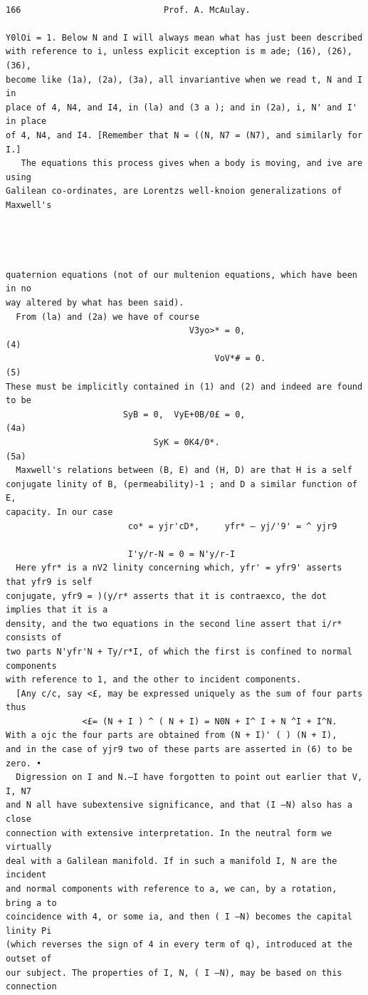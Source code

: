 \documentclass[10pt]{article}
\begin{document}
\clearpage
\begin{verbatim}

166                            Prof. A. McAulay.

Y0lOi = 1. Below N and I will always mean what has just been described
with reference to i, unless explicit exception is m ade; (16), (26), (36),
become like (1a), (2a), (3a), all invariantive when we read t, N and I in
place of 4, N4, and I4, in (la) and (3 a ); and in (2a), i, N' and I' in place
of 4, N4, and I4. [Remember that N = ((N, N7 = (N7), and similarly for I.]
   The equations this process gives when a body is moving, and ive are using
Galilean co-ordinates, are Lorentzs well-knoion generalizations of Maxwell's




quaternion equations (not of our multenion equations, which have been in no
way altered by what has been said).
  From (la) and (2a) we have of course
                                    V3yo>* = 0,                                  (4)
                                         VoV*# = 0.                               (5)
These must be implicitly contained in (1) and (2) and indeed are found to be
                       SyB = 0,  VyE+0B/0£ = 0,                                 (4a)
                             SyK = 0K4/0*.                                      (5a)
  Maxwell's relations between (B, E) and (H, D) are that H is a self­
conjugate linity of B, (permeability)-1 ; and D a similar function of E,
capacity. In our case
                        co* = yjr'cD*,     yfr* — yj/'9' = ^ yjr9

                        I'y/r-N = 0 = N'y/r-I
  Here yfr* is a nV2 linity concerning which, yfr' = yfr9' asserts that yfr9 is self­
conjugate, yfr9 = )(y/r* asserts that it is contraexco, the dot implies that it is a
density, and the two equations in the second line assert that i/r* consists of
two parts N'yfr'N + Ty/r*I, of which the first is confined to normal components
with reference to 1, and the other to incident components.
  [Any c/c, say <£, may be expressed uniquely as the sum of four parts thus
               <£= (N + I ) ^ ( N + I) = N0N + I^ I + N ^I + I^N.
With a ojc the four parts are obtained from (N + I)' ( ) (N + I),
and in the case of yjr9 two of these parts are asserted in (6) to be zero. •
  Digression on I and N.—I have forgotten to point out earlier that V, I, N7
and N all have subextensive significance, and that (I —N) also has a close
connection with extensive interpretation. In the neutral form we virtually
deal with a Galilean manifold. If in such a manifold I, N are the incident
and normal components with reference to a, we can, by a rotation, bring a to
coincidence with 4, or some ia, and then ( I —N) becomes the capital linity Pi
(which reverses the sign of 4 in every term of q), introduced at the outset of
our subject. The properties of I, N, ( I —N), may be based on this connection


\end{verbatim}
\end{document}
